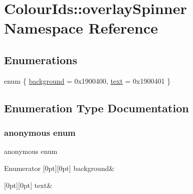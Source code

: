 \hypertarget{namespaceColourIds_1_1overlaySpinner}{}\section{Colour\+Ids\+:\+:overlay\+Spinner Namespace Reference}
\label{namespaceColourIds_1_1overlaySpinner}
\subsection*{Enumerations}
\begin{DoxyCompactItemize}
\item 
enum \{ \mbox{\hyperlink{namespaceColourIds_1_1overlaySpinner_aff14a338647f2efb4d2dc20e8cac6480a3852e1eb4b742ec9f0293269f0787fc0}{background}} = 0x1900400, 
\mbox{\hyperlink{namespaceColourIds_1_1overlaySpinner_aff14a338647f2efb4d2dc20e8cac6480a0be3eb36f0d30cd1a1ba0c6c7db1d4b0}{text}} = 0x1900401
 \}
\end{DoxyCompactItemize}


\subsection{Enumeration Type Documentation}
\mbox{\label{namespaceColourIds_1_1overlaySpinner_aff14a338647f2efb4d2dc20e8cac6480}} 
\subsubsection{\texorpdfstring{anonymous enum}{anonymous enum}}
{\footnotesize\ttfamily anonymous enum}

\begin{DoxyEnumFields}{Enumerator}
[0pt][0pt]{}\mbox{\label{namespaceColourIds_1_1overlaySpinner_aff14a338647f2efb4d2dc20e8cac6480a3852e1eb4b742ec9f0293269f0787fc0}} 
background&\\
\hline

[0pt][0pt]{}\mbox{\label{namespaceColourIds_1_1overlaySpinner_aff14a338647f2efb4d2dc20e8cac6480a0be3eb36f0d30cd1a1ba0c6c7db1d4b0}} 
text&\\
\hline

\end{DoxyEnumFields}
